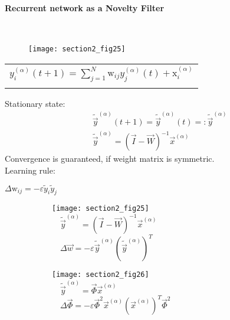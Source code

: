 \paragraph{Recurrent network as a Novelty Filter}\mbox{}\\

\begin{figure}
\centering
\texttt{[image: section2\_fig25]}
\end{figure}


\begin{tabular}{l}
				$y_i^{(\alpha)}(t+1) = \sum_{j=1}^{N} \mathrm{w}_{ij} y_j^{(\alpha)}(t) + \mathrm{x}_i^{(\alpha)}$ 	\\
				\raisebox{-0.2cm}{$\vec{y}^{(\alpha)}(t+1) = \vec{W} \vec{y}^{(\alpha)}(t) + \vec{x}^{(\alpha)}$}
\end{tabular}

Stationary state:\\
\begin{eqnarray*}
			&& \tilde{\vec{y}}^{(\alpha)}(t+1) = \tilde{\vec{y}}^{(\alpha)}(t) =: \tilde{\vec{y}}^{(\alpha)} \\
			&& \tilde{\vec{y}}^{(\alpha)} = \left( \vec{I} - \vec{W} \right)^{-1} \vec{x}^{(\alpha)}	
		\end{eqnarray*}
Convergence is guaranteed, if weight matrix is symmetric.\\
Learning rule:\\
\begin{center}
		$\Delta \mathrm{w}_{ij} = - \varepsilon \tilde{y}_i \tilde{y}_j$
\end{center}

\begin{figure}[h]
\centering 
\begin{subfigure}[b]{0.48\textwidth}
\centering
\texttt{[image: section2\_fig25]}
\\$\quad \tilde{\vec{y}}^{(\alpha)} = \left( \vec{I} - \vec{W} \right)^{-1} \vec{x}^{(\alpha)}$
\\$\quad \Delta \vec{w} = - \varepsilon \tilde{\vec{y}}^{(\alpha)} \left( \tilde{\vec{y}}^{(\alpha)} \right)^T$
\end{subfigure}
\begin{subfigure}[b]{0.48\textwidth}
\centering
\texttt{[image: section2\_fig26]}
\\$\quad \tilde{\vec{y}}^{(\alpha)} = \vec{\Phi} \vec{x}^{(\alpha)}$
\\$\quad \Delta \vec{\Phi} = - \varepsilon \vec{\Phi}^2 \vec{x}^{(\alpha)} \left( \vec{x}^{(\alpha)} \right)^T \vec{\Phi}^2$
\end{subfigure}
\end{figure}

